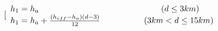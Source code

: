 \documentclass[12pt,a4paper,twocolumn,fleqn]{narms}
\begin{document}
 \begin{equation}
[\begin{array}{l}
{h_1} = {h_a}{\kern 1pt} {\kern 1pt} {\kern 1pt} {\kern 1pt} {\kern 1pt} {\kern 1pt} {\kern 1pt} {\kern 1pt} {\kern 1pt} {\kern 1pt} {\kern 1pt} {\kern 1pt} {\kern 1pt} {\kern 1pt} {\kern 1pt} {\kern 1pt} {\kern 1pt} {\kern 1pt} {\kern 1pt} {\kern 1pt} {\kern 1pt} {\kern 1pt} {\kern 1pt} {\kern 1pt} {\kern 1pt} {\kern 1pt} {\kern 1pt} {\kern 1pt} {\kern 1pt} {\kern 1pt} {\kern 1pt} {\kern 1pt} {\kern 1pt} {\kern 1pt} {\kern 1pt} {\kern 1pt} {\kern 1pt} {\kern 1pt} {\kern 1pt} {\kern 1pt} {\kern 1pt} {\kern 1pt} {\kern 1pt} {\kern 1pt} {\kern 1pt} {\kern 1pt} {\kern 1pt} {\kern 1pt} {\kern 1pt} {\kern 1pt} {\kern 1pt} {\kern 1pt} {\kern 1pt} {\kern 1pt} {\kern 1pt} {\kern 1pt} {\kern 1pt} {\kern 1pt} {\kern 1pt} {\kern 1pt} {\kern 1pt} {\kern 1pt} {\kern 1pt} {\kern 1pt} {\kern 1pt} {\kern 1pt} {\kern 1pt} {\kern 1pt} {\kern 1pt} {\kern 1pt} {\kern 1pt} {\kern 1pt} {\kern 1pt} {\kern 1pt} {\kern 1pt} {\kern 1pt} {\kern 1pt} {\kern 1pt} {\kern 1pt} {\kern 1pt} {\kern 1pt} {\kern 1pt} {\kern 1pt} {\kern 1pt} {\kern 1pt} {\kern 1pt} {\kern 1pt} {\kern 1pt} {\kern 1pt} {\kern 1pt} {\kern 1pt} {\kern 1pt} {\kern 1pt} {\kern 1pt} {\kern 1pt} {\kern 1pt} {\kern 1pt} {\kern 1pt} {\kern 1pt} {\kern 1pt} {\kern 1pt} {\kern 1pt} {\kern 1pt} {\kern 1pt} {\kern 1pt} {\kern 1pt} {\kern 1pt} {\kern 1pt} {\kern 1pt} {\kern 1pt} {\kern 1pt} {\kern 1pt} {\kern 1pt} {\kern 1pt} {\kern 1pt} {\kern 1pt} {\kern 1pt} {\kern 1pt} {\kern 1pt} {\kern 1pt} {\kern 1pt} {\kern 1pt} {\kern 1pt} {\kern 1pt} {\kern 1pt} {\kern 1pt} {\kern 1pt} {\kern 1pt} {\kern 1pt} {\kern 1pt} {\kern 1pt} {\kern 1pt} {\kern 1pt} {\kern 1pt} {\kern 1pt} {\kern 1pt} {\kern 1pt} {\kern 1pt} {\kern 1pt} {\kern 1pt} {\kern 1pt} {\kern 1pt} {\kern 1pt} {\kern 1pt} {\kern 1pt} {\kern 1pt} (d \le 3km)\\
{h_1} = {h_a} + \frac{{({h_{eff}} - {h_a})(d - 3)}}{{12}}{\kern 1pt} {\kern 1pt} {\kern 1pt} {\kern 1pt} {\kern 1pt} {\kern 1pt} {\kern 1pt} {\kern 1pt} {\kern 1pt} {\kern 1pt} {\kern 1pt} {\kern 1pt} {\kern 1pt} {\kern 1pt} {\kern 1pt} {\kern 1pt} {\kern 1pt} {\kern 1pt} {\kern 1pt} {\kern 1pt} {\kern 1pt} {\kern 1pt} {\kern 1pt} {\kern 1pt} {\kern 1pt} {\kern 1pt} {\kern 1pt} {\kern 1pt} {\kern 1pt} {\kern 1pt} {\kern 1pt} {\kern 1pt} {\kern 1pt} {\kern 1pt} {\kern 1pt} {\kern 1pt} {\kern 1pt} {\kern 1pt} {\kern 1pt} {\kern 1pt} {\kern 1pt} {\kern 1pt} {\kern 1pt} {\kern 1pt} {\kern 1pt} {\kern 1pt} {\kern 1pt} {\kern 1pt} {\kern 1pt} {\kern 1pt} {\kern 1pt} {\kern 1pt} (3km < d \le 15km)\\

\end{array}
\end{equation}
\end{document}
